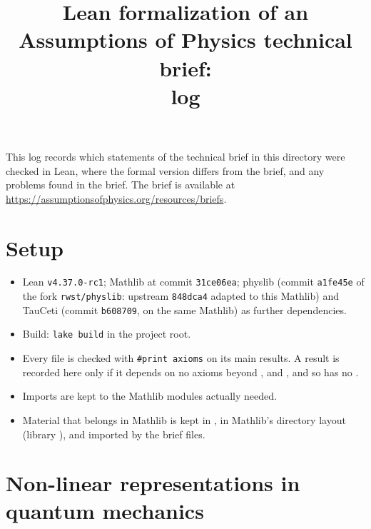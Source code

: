 \documentclass[11pt]{article}
\title{Lean formalization of an Assumptions of Physics technical brief:\\ log}
\author{}
\date{}
\begin{document}
\maketitle

\noindent
This log records which statements of the technical brief in this directory were checked in Lean,
where the formal version differs from the brief, and any problems found in the brief.
The brief is available at \url{https://assumptionsofphysics.org/resources/briefs}.

\section*{Setup}

\begin{itemize}
\item Lean \texttt{v4.37.0-rc1}; Mathlib at commit \texttt{31ce06ea}; physlib (commit \texttt{a1fe45e}
  of the fork \texttt{rwst/physlib}: upstream \texttt{848dca4} adapted to this Mathlib) and
  TauCeti (commit \texttt{b608709}, on the same Mathlib) as further dependencies.
\item Build: \texttt{lake build} in the project root.
\item Every file is checked with \texttt{\#print axioms} on its main results. A result is
  recorded here only if it depends on no axioms beyond ,
   and , and so has no .
\item Imports are kept to the Mathlib modules actually needed.
\item Material that belongs in Mathlib is kept in , in Mathlib's directory
  layout (library ), and imported by the brief files.
\end{itemize}



\section{Non-linear representations in quantum mechanics}
\end{document}
